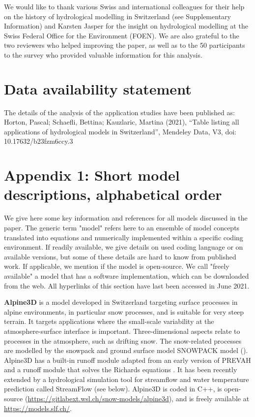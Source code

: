 \documentclass[10pt,a4paper]{article}
\begin{document}
We would like to thank various Swiss and international colleagues for their help on the history of hydrological modelling in Switzerland (see Supplementary Information) and Karsten Jasper for the insight on hydrological modelling at the Swiss Federal Office for the Environment (FOEN). We are also grateful to the two reviewers who helped improving the paper, as well as to the 50 participants to the survey who provided valuable information for this analysis.

\section*{Data availability statement}
The details of the analysis of the application studies have been published as: Horton, Pascal; Schaefli, Bettina; Kauzlaric, Martina (2021), “Table listing all applications of hydrological models in Switzerland”, Mendeley Data, V3, doi: 10.17632/b23fzm6ccy.3

\section*{Appendix 1: Short model descriptions, alphabetical order}
\label{appendix:1}

We give here some key information and references for all models discussed in the paper. The generic term "model" refers here to an ensemble of model concepts translated into equations and numerically implemented within a specific coding environment. If readily available, we give details on used coding language or on available versions, but some of these details are hard to know from published work. If applicable, we mention if the model is open-source. We call "freely available" a model that has a software implementation, which can be downloaded from the web. All hyperlinks of this section have last been accessed in June 2021.

\textbf{Alpine3D} \citep{Lehning2006} is a model developed in Switzerland targeting surface processes in alpine environments, in particular snow processes, and is suitable for very steep terrain. It targets applications where the small-scale variability at the atmosphere-surface interface is important. Three-dimensional aspects relate to processes in the atmosphere, such as drifting snow. The snow-related processes are modelled by the snowpack and ground surface model SNOWPACK model (\citealt{Bartelt2002, Lehning2002a, Lehning2002b}). Alpine3D has a built-in runoff module adapted from an early version of PREVAH \citep{Lehning2006} and a runoff module that solves the Richards equations \citep{Wever2017}. It has been recently extended by a hydrological simulation tool for streamflow and water temperature prediction called StreamFlow (see below). Alpine3D is coded in C++, is open-source (\url{https://gitlabext.wsl.ch/snow-models/alpine3d}), and is freely available at \url{https://models.slf.ch/}.
\end{document}
